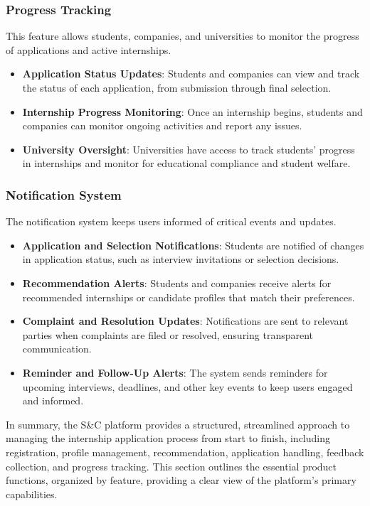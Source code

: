 \subsubsection*{Progress Tracking} 
This feature allows students, companies, and universities to monitor the progress of applications and active internships.
\begin{itemize}
    \item \textbf{Application Status Updates}: Students and companies can view and track the status of each application, from submission through final selection.
    \item \textbf{Internship Progress Monitoring}: Once an internship begins, students and companies can monitor ongoing activities and report any issues.
    \item \textbf{University Oversight}: Universities have access to track students’ progress in internships and monitor for educational compliance and student welfare.
\end{itemize}

\subsubsection*{Notification System} 
The notification system keeps users informed of critical events and updates.
\begin{itemize}
    \item \textbf{Application and Selection Notifications}: Students are notified of changes in application status, such as interview invitations or selection decisions.
    \item \textbf{Recommendation Alerts}: Students and companies receive alerts for recommended internships or candidate profiles that match their preferences.
    \item \textbf{Complaint and Resolution Updates}: Notifications are sent to relevant parties when complaints are filed or resolved, ensuring transparent communication.
    \item \textbf{Reminder and Follow-Up Alerts}: The system sends reminders for upcoming interviews, deadlines, and other key events to keep users engaged and informed.
\end{itemize}


In summary, the S\&C platform provides a structured, streamlined approach to managing the internship application process from start to finish, including registration, profile management, recommendation, application handling, feedback collection, and progress tracking. This section outlines the essential product functions, organized by feature, providing a clear view of the platform’s primary capabilities.




